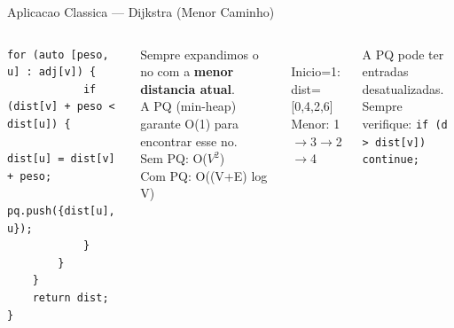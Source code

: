 \documentclass[aspectratio=169,11pt]{beamer}
\begin{document}
\begin{frame}[fragile,shrink=8]{Aplicacao Classica --- Dijkstra (Menor Caminho)}
\begin{columns}[t]
\begin{tcolorbox}[caixaCodigo]
\begin{lstlisting}[style=cppsmall]
        for (auto [peso, u] : adj[v]) {
            if (dist[v] + peso < dist[u]) {
                dist[u] = dist[v] + peso;
                pq.push({dist[u], u});
            }
        }
    }
    return dist;
}
        \end{lstlisting}
      \end{tcolorbox}
      \vspace{0.05cm}
      \begin{tcolorbox}[caixaAzul,title={Por que PQ em Dijkstra?}]
        \footnotesize
        Sempre expandimos o no com
        a \textbf{menor distancia atual}.\\[4pt]
        A PQ (min-heap) garante O(1)
        para encontrar esse no.\\[4pt]
        Sem PQ: O($V^2$)\\
        Com PQ: O((V+E) log V)
      \end{tcolorbox}
      \vspace{0.15cm}
      \begin{tcolorbox}[caixaVerde,title={Grafo de exemplo}]
        \centering\footnotesize
        \\[3pt]
        Inicio=1: dist=[0,4,2,6]\\
        Menor: 1$\to$3$\to$2$\to$4
      \end{tcolorbox}
      \vspace{0.1cm}
      \begin{tcolorbox}[caixaVermelho,title={Cuidado}]
        \footnotesize
        A PQ pode ter entradas\\
        desatualizadas. Sempre\\
        verifique: \texttt{if (d > dist[v]) continue;}
      \end{tcolorbox}
  \end{columns}
\end{frame}
\end{document}
